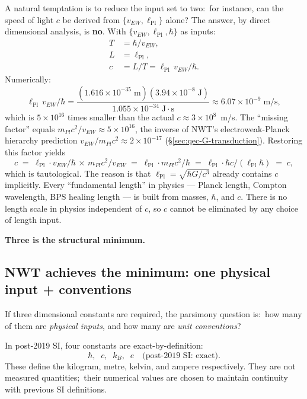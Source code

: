\documentclass[11pt]{article}
\begin{document}
A natural temptation is to reduce the input set to two:\ for
instance, can the speed of light $c$ be derived from $\{v_{EW},
\ell_{\mathrm{Pl}}\}$ alone?  The answer, by direct dimensional
analysis, is \textbf{no}.  With $\{v_{EW}, \ell_{\mathrm{Pl}}, \hbar\}$
as inputs:
\begin{align}
  T &= \hbar / v_{EW}, \\
  L &= \ell_{\mathrm{Pl}}, \\
  c &= L/T = \ell_{\mathrm{Pl}} \, v_{EW} / \hbar.
\end{align}
Numerically:
\begin{equation}
  \ell_{\mathrm{Pl}} \, v_{EW} / \hbar
  = \frac{(1.616 \times 10^{-35}\;\mathrm{m}) (3.94 \times 10^{-8}\;\mathrm{J})}
         {1.055 \times 10^{-34}\;\mathrm{J\!\cdot\! s}}
  \approx 6.07 \times 10^{-9}\;\mathrm{m/s},
\end{equation}
which is $5 \times 10^{16}$ times smaller than the actual $c \approx
3 \times 10^8$~m/s.  The ``missing factor'' equals $m_{Pl}c^2/v_{EW}
\approx 5 \times 10^{16}$, the inverse of NWT's electroweak-Planck
hierarchy prediction $v_{EW}/m_{Pl}c^2 \approx 2 \times 10^{-17}$
(\S\ref{sec:qec-G-transduction}).  Restoring this factor yields
\begin{equation}
  c \;=\; \ell_{\mathrm{Pl}} \cdot v_{EW}/\hbar \,\times\, m_{Pl}c^2/v_{EW}
    \;=\; \ell_{\mathrm{Pl}} \cdot m_{Pl}c^2 / \hbar
    \;=\; \ell_{\mathrm{Pl}} \cdot \hbar c/(\ell_{\mathrm{Pl}} \hbar)
    \;=\; c,
\end{equation}
which is tautological.  The reason is that $\ell_{\mathrm{Pl}} =
\sqrt{\hbar G/c^3}$ already contains $c$ implicitly.  Every
``fundamental length'' in physics --- Planck length, Compton
wavelength, BPS healing length --- is built from masses, $\hbar$,
and $c$.  There is no length scale in physics independent of $c$,
so $c$ cannot be eliminated by any choice of length input.

\textbf{Three is the structural minimum.}

\subsection{NWT achieves the minimum: one physical input + conventions}
\label{sec:nwt-minimum}

If three dimensional constants are required, the parsimony question
is:\ how many of them are \emph{physical inputs}, and how many are
\emph{unit conventions}?

In post-2019 SI, four constants are exact-by-definition:
\begin{equation}
  \hbar,\;\; c,\;\; k_B,\;\; e
  \quad\text{(post-2019 SI: exact)}.
\end{equation}
These define the kilogram, metre, kelvin, and ampere respectively.
They are not measured quantities;\ their numerical values are chosen
to maintain continuity with previous SI definitions.
\end{document}
